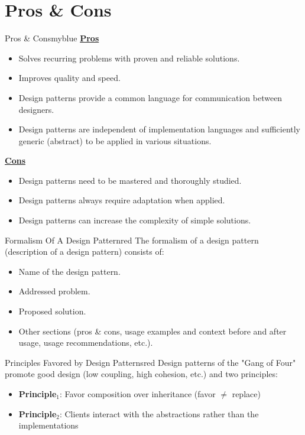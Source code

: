 \section{Pros \& Cons}
\begin{prettyBox}{Pros \& Cons}{myblue}
\textbf{\underline{Pros}}
\begin{itemize}
    \item Solves recurring problems with proven and reliable solutions.
    \item Improves quality and speed.
    \item Design patterns provide a common language for communication between designers.
    \item Design patterns are independent of implementation languages and sufficiently generic (abstract) to be applied in various situations.
\end{itemize}

\textbf{\underline{Cons}}
\begin{itemize}
    \item Design patterns need to be mastered and thoroughly studied.
    \item Design patterns always require adaptation when applied.
    \item Design patterns can increase the complexity of simple solutions.
\end{itemize}

\end{prettyBox}

\vspace{0.25cm}

\begin{prettyBox}{Formalism Of A Design Pattern}{red}
The formalism of a design pattern (description of a design pattern) consists of:  
\begin{itemize}
    \item Name of the design pattern.  
    \item Addressed problem.  
    \item Proposed solution.  
    \item Other sections (pros \& cons, usage examples and context before and after usage, usage recommendations, etc.).  
\end{itemize}
\end{prettyBox}

\vspace{0.5cm}

\begin{prettyBox}{Principles Favored by Design Patterns}{red}
Design patterns of the "Gang of Four" promote good design (low coupling,  
high cohesion, etc.) and two principles:  
\begin{itemize}
    \item \textbf{Principle\(_1\)}: Favor composition over inheritance (favor \(\neq\) replace)  
    \item \textbf{Principle\(_2\)}: Clients interact with the abstractions rather  
        than the implementations  
\end{itemize}
\end{prettyBox}

